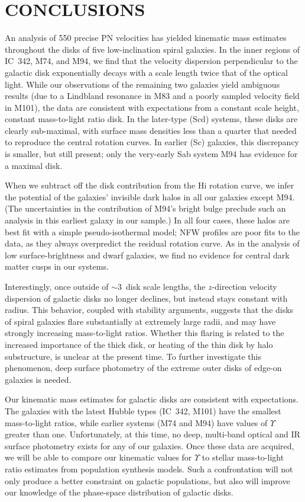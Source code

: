 \documentclass[12pt,preprint]{emulateapj}
\begin{document}
\section{CONCLUSIONS}

An analysis of 550 precise PN velocities has yielded kinematic mass estimates throughout the disks of five low-inclination spiral galaxies.  In the inner regions of IC~342, M74, and M94, we find that the velocity dispersion perpendicular to the galactic disk exponentially decays with a scale length twice that of the optical light.  While our observations of the remaining two galaxies yield ambiguous results (due to a Lindbland resonance in M83 and a poorly sampled velocity field in M101), the data are consistent with expectations from a constant scale height, constant mass-to-light ratio disk.   In the later-type (Scd) systems, these disks are clearly sub-maximal, with surface mass densities less than a quarter that needed to reproduce the central rotation curves.  In earlier (Sc) galaxies, this discrepancy is smaller, but still present; only the very-early Sab system M94 has evidence for a maximal disk.  

When we subtract off the disk contribution from the H{\sc i} rotation curve, we infer the potential of the galaxies' invisible dark halos in all our galaxies except M94.  (The uncertainties in the contribution of M94's bright bulge preclude such an analysis in this earliest galaxy in our sample.)   In all four cases, these halos are best fit with a simple pseudo-isothermal model; NFW profiles are poor fits to the data, as they always overpredict the residual rotation curve.  As in the analysis of low surface-brightness and dwarf galaxies, we find no evidence for central dark matter cusps in our systems.

Interestingly, once outside of $\sim$3~disk scale lengths, the $z$-direction velocity dispersion of galactic disks no longer declines, but instead stays constant with radius.  This behavior, coupled with stability arguments, suggests that the disks of spiral galaxies flare substantially at extremely large radii, and may have strongly increasing mass-to-light ratios.   Whether this flaring is related to the increased importance of the thick disk, or heating of the thin disk by halo substructure, is unclear at the present time.  To further investigate this phenomenon, deep surface photometry of the extreme outer disks of edge-on galaxies is needed.

Our kinematic mass estimates for galactic disks are consistent with expectations.  The galaxies with the latest Hubble types (IC~342, M101) have the smallest mass-to-light ratios, while earlier systems (M74 and M94) have values of $\Upsilon$ greater than one.  Unfortunately, at this time, no deep, multi-band optical and IR surface photometry exists for any of our galaxies.  Once these data are acquired, we will be able to compare our kinematic values for $\Upsilon$ to stellar mass-to-light ratio estimates from population synthesis models.  Such a confrontation will not only produce a better constraint on galactic populations, but also will improve our knowledge of the phase-space distribution of galactic disks.
\end{document}
